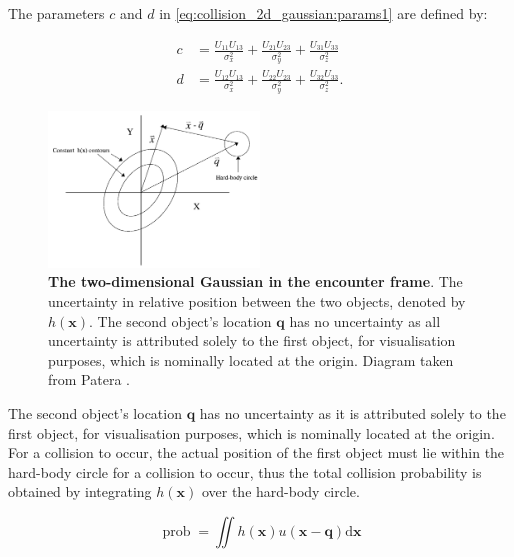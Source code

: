 The parameters $c$ and $d$ in \autoref{eq:collision_2d_gaussian:params1} are defined by:

\begin{equation}
    \begin{alignat}{2}
        c & =\frac{U_{11} U_{13}}{\sigma_{x}^{2}}+\frac{U_{21} U_{23}}{\sigma_{y}^{2}}+\frac{U_{31} U_{33}}{\sigma_{z}^{2}} \label{eq:collision_2d_gaussian:c}  \\
        d & =\frac{U_{12} U_{13}}{\sigma_{x}^{2}}+\frac{U_{22} U_{23}}{\sigma_{y}^{2}}+\frac{U_{32} U_{33}}{\sigma_{z}^{2}}. \label{eq:collision_2d_gaussian:d}
    \end{alignat}
\end{equation}


\begin{figure}
    \centering
    \captionsetup{format=hang} %
    \includegraphics[width=0.5\textwidth]{graphics/encounter-frame.png}
    \caption{\textbf{The two-dimensional Gaussian in the encounter frame}. The uncertainty in relative position between the two objects, denoted by $h(\boldsymbol{x})$. The second object's location $\boldsymbol{q}$ has no uncertainty as all uncertainty is attributed solely to the first object, for visualisation purposes, which is nominally located at the origin. Diagram taken from Patera \cite{Patera2001}.}
    \label{fig:collision_2d_gaussian}
\end{figure}

The second object's location $\boldsymbol{q}$ has no uncertainty as it is attributed solely to the first object, for visualisation purposes, which is nominally located at the origin. For a collision to occur, the actual position of the first object must lie within the hard-body circle for a collision to occur, thus the total collision probability is obtained by integrating $h(\boldsymbol{x})$ over the hard-body circle.

\begin{equation}
    \operatorname{prob}=\iint h(\boldsymbol{x}) u(\boldsymbol{x}-\boldsymbol{q}) \mathrm{d} \boldsymbol{x}
\end{equation}

